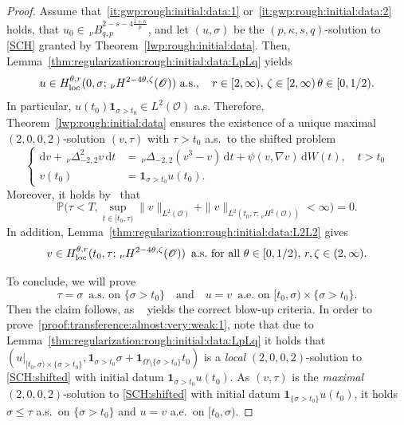 \documentclass[reqno]{amsart}
\newcommand{\sO}{\mathscr{O}}
\newcommand{\1}{\mathbf{1}}
\newcommand{\dt}{\,\mathrm{d}t}
\newcommand{\loc}{\textup{loc}}
\newcommand{\nH}{\ensuremath{\,_\nu H}}
\newcommand{\bpsn}[1]{\ensuremath{\nH^{#1}(\sO)}}
\newcommand{\dd}{\ensuremath{\mathrm{d}}}
\begin{document}
    \begin{proof}
        Assume that~\ref{it:gwp:rough:initial:data:1} or~\ref{it:gwp:rough:initial:data:2} holds, that $u_0\in \,_\nu B^{2-s-4\frac{1+\kappa}{p}}_{q,p}$, and let $(u,\sigma)$ be the $(p,\kappa,s,q)$-solution to \eqref{SCH} granted by Theorem~\ref{lwp:rough:initial:data}. Then,  Lemma~\ref{thm:regularization:rough:initial:data:LpLq} yields 
        \begin{equation}\label{proof:transference:almost:very:weak:0}
            u\in H_{\loc}^{\theta,r}(0,\sigma; \bpsn{2-4\theta,\zeta}) \text{ a.s.}, \quad r\in [2,\infty),\, \zeta \in [2,\infty)\, \theta\in[0,1/2).
        \end{equation}
        In particular, $u(t_0)\1_{\sigma>t_0}\in L^2(\sO)$ a.s. Therefore, Theorem~\ref{lwp:rough:initial:data}  ensures the existence of a unique maximal $(2,0,0,2)$-solution $(v,\tau)$ with $\tau>t_0$ a.s.\ to the shifted problem 
        \begin{equation}\label{SCH:shifted}
        \begin{cases}
         \dd v + \,_\nu\Delta_{-2,2}^2 v \dt &= \,_\nu\Delta_{-2,2}(v^3-v)\dt + \psi(v,\nabla v) \,\dd W(t), \quad t>t_0\\
         v(t_0)&= \1_{\sigma>t_0}u(t_0).
\end{cases}
    \end{equation}
    Moreover, it holds by~\cite[Theorem 4.10]{agrestiNonlinearParabolicStochastic2022a} that 
    \[\mathbb{P}\big( \tau<T , \sup_{t\in[t_0,\tau) }\|v\|_{L^2(\sO)}+ \|v\|_{L^2(t_0,\tau;\bpsn{2}) }<\infty \big)=0.\]
In addition, Lemma~\ref{thm:regularization:rough:initial:data:L2L2} gives
\begin{equation}\label{proof:transference:almost:very:weak:2}
    v\in H_{\loc}^{\theta,r}(t_0,\tau;\nH^{2-4\theta,\zeta}(\sO)) \,\text{ a.s.\ for all } \theta\in [0,1/2), \, r,\zeta\in (2,\infty). 
\end{equation}

    To conclude, we will prove 
\begin{equation}\label{proof:transference:almost:very:weak:1}
    \tau=\sigma\,  \text{ a.s.\ on }\{\sigma>t_0\} \quad \text{and}\quad u=v \, \text{ a.e.\ on }[t_0,\sigma)\times\{\sigma>t_0\}. 
\end{equation}
Then the claim follows, as ~\cite[Theorem 4.10]{agrestiNonlinearParabolicStochastic2022a} yields the correct blow-up criteria.
In order to prove~\eqref{proof:transference:almost:very:weak:1}, note that due to Lemma~\ref{thm:regularization:rough:initial:data:LpLq} it holds that  $(u|_{[t_0,\sigma)\times\{\sigma>t_0\}}, \1_{\sigma>t_0}\sigma+\1_{\Omega\setminus\{\sigma>t_0\}}t_0)$ is a \emph{local} $(2,0,0,2)$-solution  to \eqref{SCH:shifted} with initial datum $\1_{\sigma>t_0}u(t_0)$. 
As $(v,\tau)$ is the \emph{maximal} $(2,0,0,2)$-solution to \eqref{SCH:shifted} with initial datum $\1_{\{\sigma>t_0\}}u(t_0)$, it holds $\sigma\le \tau$ a.s.\ on $\{\sigma>t_0\}$ and $u=v$ a.e.\ on $[t_0,\sigma)$. 


\end{proof}
\end{document}
